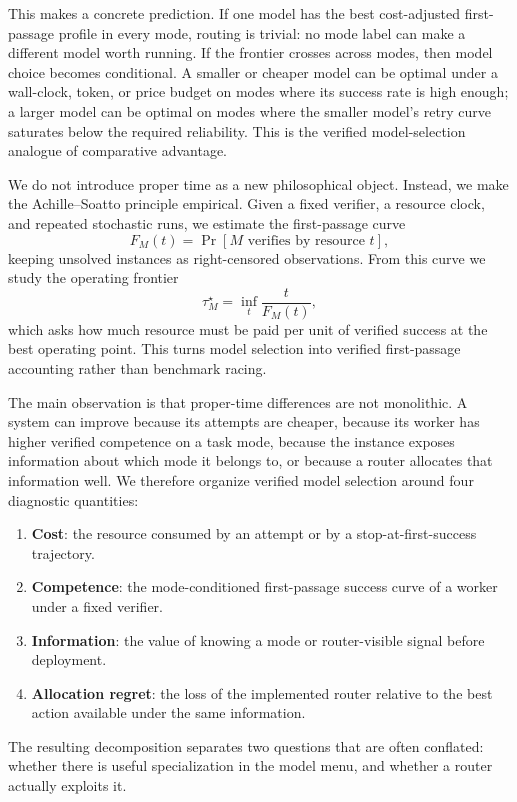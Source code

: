 \documentclass[10pt,twocolumn]{article}
\theoremstyle{definition}
\theoremstyle{plain}
\theoremstyle{remark}
\begin{document}
This makes a concrete prediction.  If one model has the best cost-adjusted
first-passage profile in every mode, routing is trivial: no mode label can make
a different model worth running.  If the frontier crosses across modes, then
model choice becomes conditional.  A smaller or cheaper model can be optimal
under a wall-clock, token, or price budget on modes where its success rate is
high enough; a larger model can be optimal on modes where the smaller model's
retry curve saturates below the required reliability.  This is the verified
model-selection analogue of comparative advantage.

We do not introduce proper time as a new philosophical object.  Instead, we
make the Achille--Soatto principle empirical.  Given a fixed verifier, a
resource clock, and repeated stochastic runs, we estimate the first-passage
curve
\[
    F_M(t)
    =
    \Pr[\text{\(M\) verifies by resource } t],
\]
keeping unsolved instances as right-censored observations.  From this curve we
study the operating frontier
\[
    \tau^\star_M = \inf_t \frac{t}{F_M(t)},
\]
which asks how much resource must be paid per unit of verified success at the
best operating point.  This turns model selection into verified first-passage
accounting rather than benchmark racing.

The main observation is that proper-time differences are not monolithic.  A
system can improve because its attempts are cheaper, because its worker has
higher verified competence on a task mode, because the instance exposes
information about which mode it belongs to, or because a router allocates that
information well.  We therefore organize verified model selection around four
diagnostic quantities:
\begin{enumerate}
  \item \textbf{Cost}: the resource consumed by an attempt or by a
  stop-at-first-success trajectory.
  \item \textbf{Competence}: the mode-conditioned first-passage success curve of
  a worker under a fixed verifier.
  \item \textbf{Information}: the value of knowing a mode or router-visible
  signal before deployment.
  \item \textbf{Allocation regret}: the loss of the implemented router relative
  to the best action available under the same information.
\end{enumerate}
The resulting decomposition separates two questions that are often conflated:
whether there is useful specialization in the model menu, and whether a router
actually exploits it.
\end{document}
